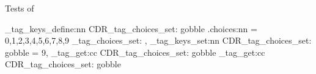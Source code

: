 Tests of 

\ExplSyntaxOn
\CDR_tag_keys_define:nn { CDR_tag_choices_set: } {
  gobble .choices:nn = {
    0,1,2,3,4,5,6,7,8,9
  } {
    \CDR_tag_choices_set:
  },
}
\CDR_tag_keys_set:nn { CDR_tag_choices_set: } {
  gobble = 9,
}
\CDR_tag_get:cc { CDR_tag_choices_set: } { gobble }
\CDR_tag_get:cc { CDR_tag_choices_set: } { gobble }
\ExplSyntaxOff
